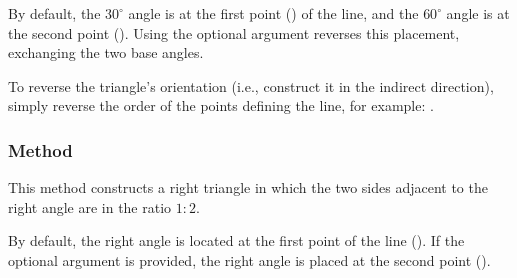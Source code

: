 \medskip

By default, the $30^\circ$ angle is at the first point () of the line, and the $60^\circ$ angle is at the second point (). Using the optional argument  reverses this placement, exchanging the two base angles.

\medskip

To reverse the triangle’s orientation (i.e., construct it in the indirect direction), simply reverse the order of the points defining the line, for example:
.

\vspace{1em}
\begin{minipage}{.5\textwidth}
\begin{center}
\end{center}

\end{minipage}
\begin{minipage}{.5\textwidth}
\begin{tkzexample}
\end{tkzexample}
\end{minipage}

\subsubsection{Method }
\label{ssub:method_imeth_line_half_swap}

This method constructs a right triangle in which the two sides adjacent to the right angle are in the ratio $1:2$.

\medskip

By default, the right angle is located at the first point of the line (). If the optional argument  is provided, the right angle is placed at the second point ().

